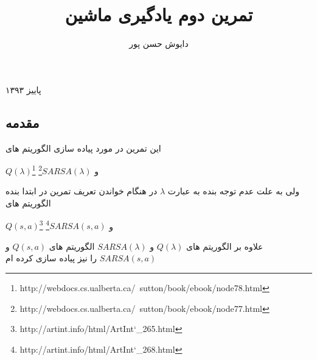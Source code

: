 \documentclass[10pt,a4paper]{article}
\begin{document}
\title{\textarabic{تمرین دوم یادگیری ماشین}}
\author{\textarabic{دایوش حسن پور}}
\date{}
\maketitle
\null
\vfill
\begin{center}
\textarabic{پاییز ۱۳۹۳}
\end{center}
\newpage

\begin{Arabic}
\section{\textarabic{مقدمه}}
این تمرین در مورد پیاده سازی الگوریتم های 
\end{Arabic}
\textenglish{$Q(\lambda)$\footnote{http://webdocs.cs.ualberta.ca/~sutton/book/ebook/node78.html}}
\textarabic{و}
\textenglish{$SARSA(\lambda)$\footnote{http://webdocs.cs.ualberta.ca/~sutton/book/ebook/node77.html}}
\begin{Arabic}
ولی به علت عدم توجه بنده به عبارت 
$\lambda$
در هنگام خواندن تعریف تمرین در ابتدا بنده الگوریتم های 
\end{Arabic}
\textenglish{$Q(s, a)$\footnote{http://artint.info/html/ArtInt\char`_265.html}}
\textarabic{و}
\textenglish{$SARSA(s, a)$\footnote{http://artint.info/html/ArtInt\char`_268.html}}
\begin{Arabic}
علاوه بر الگوریتم های
\textenglish{$Q(\lambda)$} و \textenglish{$SARSA(\lambda)$} 
الگوریتم های 
\textenglish{$Q(s, a)$} و \textenglish{$SARSA(s,a)$} 
را نیز پیاده سازی کرده ام
\end{Arabic}
\end{document}
